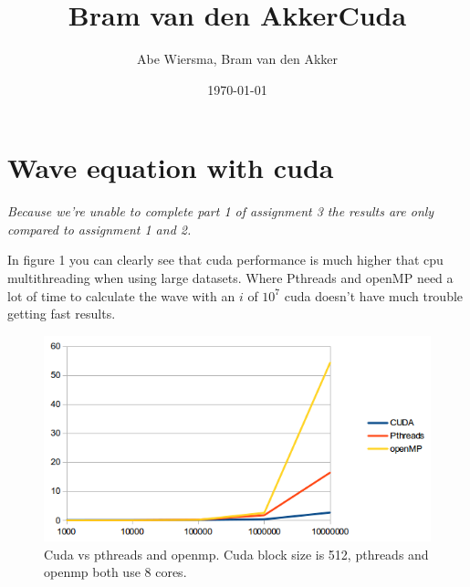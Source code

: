 \documentclass[10pt]{article}
\title{\bfseries\Huge Bram van den Akker}
\date{}
\begin{document}
\title{Cuda}
\author{Abe Wiersma, Bram van den Akker}
\date{\today}
\maketitle
\newpage

\section{Wave equation with cuda}
\textit{Because we're unable to complete part 1 of assignment 3 the results are only compared to assignment 1 and 2. }

In figure 1 you can clearly see that cuda performance is much higher that cpu multithreading when using large datasets. Where Pthreads and openMP need a lot of time to calculate the wave with an $i$ of $10^7$ cuda doesn't have much trouble getting fast results.


\begin{figure}[h]
  \centering
    \includegraphics[width=\textwidth]{123compare.png}
  \caption{Cuda vs pthreads and openmp. Cuda block size is 512, pthreads and openmp both use 8 cores.}
\end{figure}
\break
\end{document}

